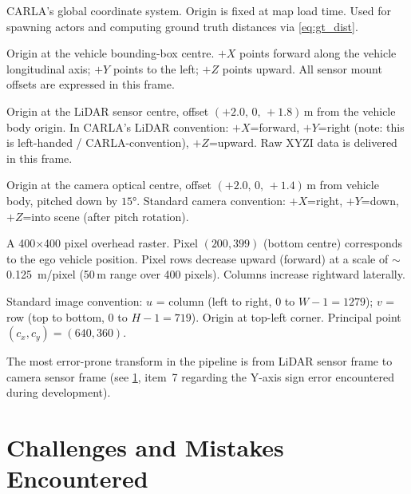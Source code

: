 \documentclass[12pt,a4paper]{article}
\begin{document}
\begin{description}[leftmargin=2em, itemsep=3pt]
  \item[\textbf{World frame}]
        CARLA's global coordinate system.  Origin is fixed at map load time.
        Used for spawning actors and computing ground truth distances via
        \cref{eq:gt_dist}.

  \item[\textbf{Vehicle body frame}]
        Origin at the vehicle bounding-box centre.  $+X$ points forward along
        the vehicle longitudinal axis; $+Y$ points to the left; $+Z$ points
        upward.  All sensor mount offsets are expressed in this frame.

  \item[\textbf{LiDAR sensor frame}]
        Origin at the LiDAR sensor centre, offset $(+2.0,\,0,\,+1.8)$\,m
        from the vehicle body origin.  In CARLA's LiDAR convention:
        $+X$=forward, $+Y$=right (note: this is left-handed / CARLA-convention),
        $+Z$=upward.  Raw XYZI data is delivered in this frame.

  \item[\textbf{Camera sensor frame}]
        Origin at the camera optical centre, offset $(+2.0,\,0,\,+1.4)$\,m
        from vehicle body, pitched down by $15°$.
        Standard camera convention: $+X$=right, $+Y$=down, $+Z$=into scene
        (after pitch rotation).

  \item[\textbf{BEV canvas frame}]
        A 400$\times$400 pixel overhead raster.  Pixel $(200, 399)$ (bottom
        centre) corresponds to the ego vehicle position.  Pixel rows decrease
        upward (forward) at a scale of $\sim$\SI{0.125}{\metre/pixel}
        (50\,m range over 400 pixels).  Columns increase rightward laterally.

  \item[\textbf{Image frame}]
        Standard image convention: $u$ = column (left to right, $0$ to
        $W-1 = 1279$); $v$ = row (top to bottom, $0$ to $H-1 = 719$).
        Origin at top-left corner.  Principal point $(c_x, c_y) = (640, 360)$.
\end{description}

\noindent
The most error-prone transform in the pipeline is from LiDAR sensor frame to
camera sensor frame (see \cref{sec:challenges}, item~7 regarding the Y-axis
sign error encountered during development).


\section{Challenges and Mistakes Encountered}
\label{sec:challenges}
\end{document}
